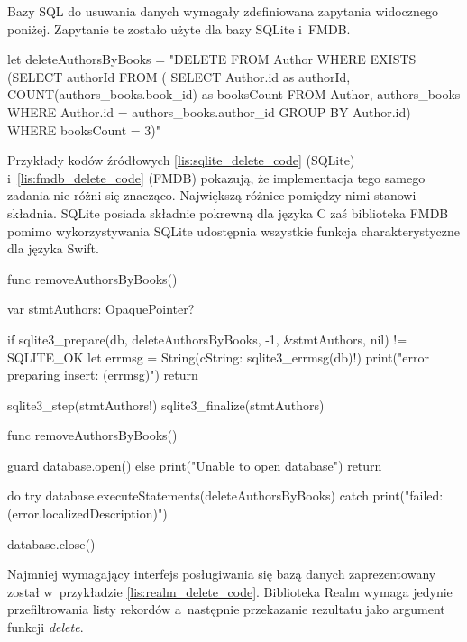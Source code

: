 Bazy SQL do usuwania danych wymagały zdefiniowana zapytania widocznego poniżej. Zapytanie te zostało użyte dla bazy SQLite i~FMDB.

\begin{code}[
		language=swift,
		caption={Zapytanie SQL do usuwania danych},
		label={lis:sql_delete_query_code},
	]
let deleteAuthorsByBooks = "DELETE FROM Author WHERE EXISTS (SELECT authorId FROM ( SELECT Author.id as authorId, COUNT(authors_books.book_id) as booksCount FROM Author, authors_books WHERE Author.id = authors_books.author_id GROUP BY Author.id) WHERE booksCount = 3)"
\end{code}

Przykłady kodów źródłowych \ref{lis:sqlite_delete_code} (SQLite) i~\ref{lis:fmdb_delete_code} (FMDB) pokazują, że implementacja tego samego zadania nie różni się znacząco. Największą różnice pomiędzy nimi stanowi składnia. SQLite posiada składnie pokrewną dla języka C zaś biblioteka FMDB pomimo wykorzystywania SQLite udostępnia wszystkie funkcja charakterystyczne dla języka Swift. 

\begin{code}[
		language=swift,
		caption={Przykład usuwania danych SQLite},
		label={lis:sqlite_delete_code},
	]
    func removeAuthorsByBooks() {
        var stmtAuthors: OpaquePointer?
        
        if sqlite3_prepare(db, deleteAuthorsByBooks, -1, &stmtAuthors, nil) != SQLITE_OK {
            let errmsg = String(cString: sqlite3_errmsg(db)!)
            print("error preparing insert: (errmsg)")
            return
        }
        
        sqlite3_step(stmtAuthors!)
        sqlite3_finalize(stmtAuthors)
    }
\end{code}

\begin{code}[
		language=swift,
		caption={Przykład usuwania danych FMDB},
		label={lis:fmdb_delete_code},
	]
    func removeAuthorsByBooks() {
        guard database.open() else {
            print("Unable to open database")
            return
        }

        do {
            try database.executeStatements(deleteAuthorsByBooks)
        } catch {
            print("failed: (error.localizedDescription)")
        }
        
        database.close()
    }
\end{code}

Najmniej wymagający interfejs posługiwania się bazą danych zaprezentowany został w~przykładzie \ref{lis:realm_delete_code}. Biblioteka Realm wymaga jedynie przefiltrowania listy rekordów a~następnie przekazanie rezultatu jako argument funkcji \textit{delete}. 

